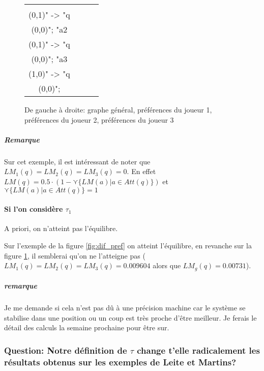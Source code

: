 \documentclass[12pt]{article}
\theoremstyle{defi}
\theoremstyle{not}
\theoremstyle{prob}
\begin{document}
\begin{figure}
\begin{tabular}{cccc}
              \begin{tikzpicture}[>=stealth]
              \graph [ layered layout, nodes = {scale=0.75, align=center} ] {
              "a1\\ (0,1)" -> "q\\ (0,0)";
              "a2\\ (0,1)" -> "q\\ (0,0)";
              "a3\\ (1,0)" -> "q\\ (0,0)";
              };
              \end{tikzpicture} \\
            \end{tabular}

            \caption{De gauche à droite: graphe général, préférences du joueur 1, préférences du joueur 2, préférences du joueur 3}
            \label{fig:trivial}
          \end{figure}

          \subparagraph{Remarque\\}
            Sur cet exemple, il est intéressant de noter que $LM_1(q) = LM_2(q) = LM_3(q) = 0$.
            En effet $LM(q) = 0.5 \cdot (1 - \curlyvee \{LM(a) | a\in Att(q)\})$ et $\curlyvee \{LM(a) | a\in Att(q)\} = 1$


        \paragraph{Si l'on considère $\tau_1$\\}
          A priori, on n'atteint pas l'équilibre.

          Sur l'exemple de la figure \ref{fig:dif_pref} on atteint l'équilibre, en revanche sur la figure \ref{fig:trivial}, il semblerai qu'on ne l'atteigne pas ($LM_1(q) = LM_2(q) = LM_3(q) = 0.009604$ alors que $LM_g(q) = 0.00731$).

          \subparagraph{remarque\\} Je me demande si cela n'est pas dû à une précision machine car le système se stabilise dans une position ou un coup est très proche d'être meilleur.
            Je ferais le détail des calculs la semaine prochaine pour être sur.

      \subsubsection{Question: Notre définition de $\tau$ change t'elle radicalement les résultats obtenus sur les exemples de Leite et Martins?}
\end{document}
